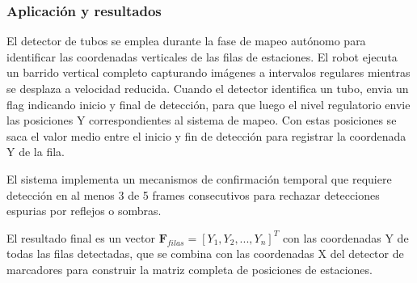 \subsubsection{Aplicación y resultados}

El detector de tubos se emplea durante la fase de mapeo autónomo para identificar las coordenadas verticales de las filas de estaciones. El robot ejecuta un barrido vertical completo capturando imágenes a intervalos regulares mientras se desplaza a velocidad reducida. Cuando el detector identifica un tubo, envia un flag indicando inicio y final de detección, para que luego el nivel regulatorio envie las posiciones Y correspondientes al sistema de mapeo. Con estas posiciones se saca el valor medio entre el inicio y fin de detección para registrar la coordenada Y de la fila.

El sistema implementa un mecanismos de confirmación temporal que requiere detección en al menos 3 de 5 frames consecutivos para rechazar detecciones espurias por reflejos o sombras.

El resultado final es un vector $\mathbf{F}_{filas} = [Y_1, Y_2, ..., Y_n]^T$ con las coordenadas Y de todas las filas detectadas, que se combina con las coordenadas X del detector de marcadores para construir la matriz completa de posiciones de estaciones.